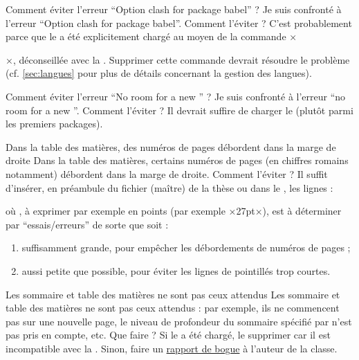 \begin{dbfaq}{Comment éviter l'erreur \enquote{Option clash for package babel} ?}{}
  Je suis confronté à l'erreur \enquote{Option clash for package
    babel}. Comment l'éviter ?
  \tcblower
  C'est probablement parce que le  a été explicitement chargé au
  moyen de la commande ×\usepackage[...]{babel}×, déconseillée avec la
  \yatcl{}. Supprimer cette commande devrait résoudre le problème
  (cf. \vref{sec:langues} pour plus de détails concernant la gestion des
  langues).
\end{dbfaq}

\begin{dbfaq}{Comment éviter l'erreur \enquote{No room for a new
      \protect{}} ?}{}
  Je suis confronté à l'erreur \enquote{no room for a new
    }. Comment l'éviter ?
  \tcblower
  Il devrait suffire de charger le  (plutôt parmi les
  premiers packages).
\end{dbfaq}

\begin{dbfaq}{Dans la table des matières, des numéros de pages débordent dans
    la marge de droite}{}
  Dans la table des matières, certains numéros de pages (en chiffres romains
  notamment) débordent dans la marge de droite. Comment l'éviter ?
  \tcblower
  Il suffit d'insérer, en préambule du fichier (maître) de la thèse ou dans le
  \File{\configurationfile}, les lignes :
\begin{preamblecode}
\makeatletter
\renewcommand*\@pnumwidth{÷\meta{distance}÷}
\makeatother
\end{preamblecode}
où , à exprimer par exemple en points (par exemple ×27pt×), est
à déterminer par \enquote{essais/erreurs} de sorte que  soit :
\begin{enumerate}
\item suffisamment grande, pour empêcher les débordements de numéros de pages ;
\item aussi petite que possible, pour éviter les lignes de pointillés trop
  courtes.
\end{enumerate}
\end{dbfaq}

\begin{dbfaq}{Les sommaire et table des matières ne sont pas ceux attendus}{}
  Les sommaire et table des matières ne sont pas ceux attendus : par exemple,
  ils ne commencent pas sur une nouvelle page, le niveau de profondeur du
  sommaire spécifié par  n'est pas pris en compte, etc. Que faire ?
  \tcblower
  Si le  a été chargé, le supprimer car il est incompatible
  avec la \yatcl{}. Sinon, faire un \hyperref[faq:bogues]{rapport de bogue}
  à l'auteur de la classe.
\end{dbfaq}


%
\iffalse
\fi
